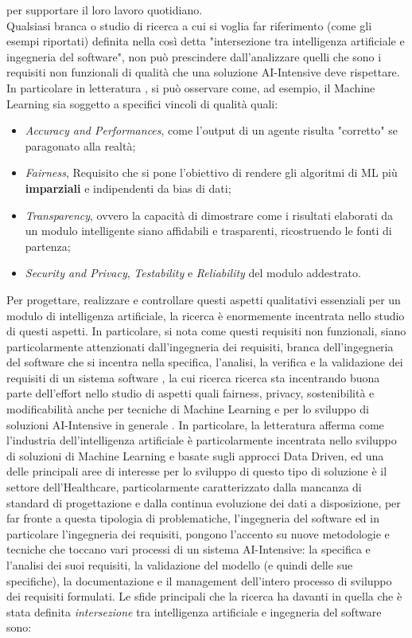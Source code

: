 per supportare il loro lavoro quotidiano\cite{rech2004artificial}.\\

Qualsiasi branca o studio di ricerca a cui si voglia far riferimento (come gli esempi riportati) definita nella così detta "intersezione tra intelligenza artificiale e ingegneria del software", non può prescindere dall'analizzare quelli che sono i requisiti non funzionali di qualità che una soluzione AI-Intensive deve rispettare. In particolare in letteratura \cite{NFRForML}, si può osservare come, ad esempio, il Machine Learning sia soggetto a specifici vincoli di qualità quali: 

\begin{itemize}
    \item \emph{Accuracy and Performances}, come l'output di un agente risulta "corretto" se paragonato alla realtà;
    \item \emph{Fairness}, Requisito che si pone l'obiettivo di rendere gli algoritmi di ML più \textbf{imparziali} e indipendenti da bias di dati;
    \item \emph{Transparency}, ovvero la capacità di dimostrare come i risultati elaborati da un modulo intelligente siano affidabili e trasparenti, ricostruendo le fonti di partenza;
    \item \emph{Security and Privacy}, \emph{Testability} e \emph{Reliability} del modulo addestrato.
\end{itemize}

Per progettare, realizzare e controllare questi aspetti qualitativi essenziali per un modulo di intelligenza artificiale, la ricerca è enormemente incentrata nello studio di questi aspetti. In particolare, si nota come questi requisiti non funzionali, siano particolarmente attenzionati dall'ingegneria dei requisiti, branca dell'ingegneria del software che si incentra nella specifica, l'analisi, la verifica e la validazione dei requisiti di un sistema software \cite{RE&Ai}, la cui ricerca ricerca sta incentrando buona parte dell'effort nello studio di aspetti quali fairness, privacy, sostenibilità e modificabilità anche per tecniche di Machine Learning e per lo sviluppo di soluzioni AI-Intensive in generale \cite{NFRForML}. In particolare, la letteratura afferma come l'industria dell'intelligenza artificiale è particolarmente incentrata nello sviluppo di soluzioni di Machine Learning e basate sugli approcci Data Driven, ed una delle principali aree di interesse per lo sviluppo di questo tipo di soluzione è il settore dell'Healthcare, particolarmente caratterizzato dalla mancanza di standard di progettazione e dalla continua evoluzione dei dati a disposizione\cite{RE&Ai}, per far fronte a questa tipologia di problematiche, l'ingegneria del software ed in particolare l'ingegneria dei requisiti, pongono l'accento su nuove metodologie e tecniche che toccano vari processi di un sistema AI-Intensive: la specifica e l'analisi dei suoi requisiti, la validazione del modello (e quindi delle sue specifiche), la documentazione e il management dell'intero processo di sviluppo dei requisiti formulati. Le sfide principali che la ricerca ha davanti in quella che è stata definita \textit{intersezione} tra intelligenza artificiale e ingegneria del software sono:

